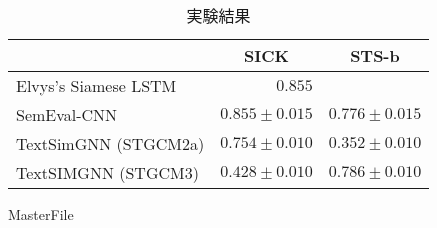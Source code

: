 \documentclass[a4j,twoside,12pt]{thesis} %
\begin{document}
\begin{table}
  \caption{実験結果}
  \label{table:baseline}
  \begin{center}
  \begin{tabular}{p{35mm}||r|r}
    \hline
          & \multicolumn{1}{c|}{SICK} & \multicolumn{1}{c}{STS-b} \\
    \hline
    Elvys's Siamese LSTM &      $0.855$   &                            \\
    SemEval-CNN &     $0.855 \pm 0.015$   &       $0.776 \pm 0.015$     \\
    TextSimGNN (STGCM2a) &  $0.754 \pm 0.010$     & $0.352 \pm 0.010 $        \\
    TextSIMGNN (STGCM3) &   $0.428 \pm 0.010$ &   $0.786 \pm 0.010 $   \\
    \hline
  \end{tabular}
  \end{center}
\end{table}
\expandafter\ifx\csname MasterFile\endcsname\relax
\def\MasterFile{本原稿です}

% 



\end{document}

